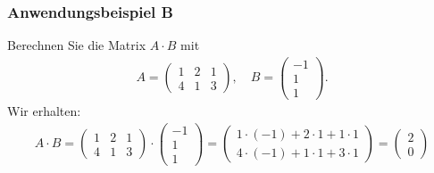 \subsubsection*{Anwendungsbeispiel B}
Berechnen Sie die Matrix $A \cdot B$ mit
\begin{align*}
A 
=
\begin{pmatrix}
1 &  2  & 1\\
4 & 1 & 3
\end{pmatrix},
\quad
B=
\begin{pmatrix}
-1\\ 1\\  1
\end{pmatrix}.
\end{align*}
Wir erhalten:
\begin{align*}
A \cdot B
=
\begin{pmatrix}
1 &  2  & 1\\
4 & 1 & 3
\end{pmatrix}
\cdot
\begin{pmatrix}
-1\\ 1\\  1
\end{pmatrix}
= 
\begin{pmatrix}
1 \cdot (-1) + 2 \cdot 1 + 1 \cdot 1\\
4 \cdot (-1) + 1 \cdot 1 + 3 \cdot 1
\end{pmatrix}
=
\begin{pmatrix}
2\\
0
\end{pmatrix}
\end{align*}

